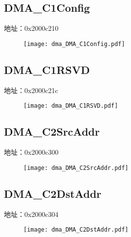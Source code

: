 \subsection{DMA\_C1Config}
\label{dma-DMA-C1Config}
地址：0x2000c210
 \begin{figure}[H]
\texttt{[image: dma\_DMA\_C1Config.pdf]}
\end{figure}

\subsection{DMA\_C1RSVD}
\label{dma-DMA-C1RSVD}
地址：0x2000c21c
 \begin{figure}[H]
\texttt{[image: dma\_DMA\_C1RSVD.pdf]}
\end{figure}

\subsection{DMA\_C2SrcAddr}
\label{dma-DMA-C2SrcAddr}
地址：0x2000c300
 \begin{figure}[H]
\texttt{[image: dma\_DMA\_C2SrcAddr.pdf]}
\end{figure}

\subsection{DMA\_C2DstAddr}
\label{dma-DMA-C2DstAddr}
地址：0x2000c304
 \begin{figure}[H]
\texttt{[image: dma\_DMA\_C2DstAddr.pdf]}
\end{figure}

